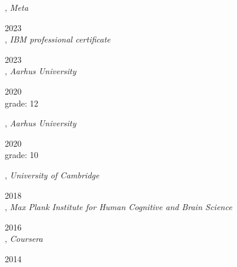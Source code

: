 

,
\textit{Meta}\strut \hfill 2023\\

,
\textit{IBM professional certificate}\strut \hfill 2023\\

,
\textit{Aarhus University}\strut \hfill 2020\\
grade: 12

,
\textit{Aarhus University}\strut \hfill 2020\\
grade: 10

,
\textit{University of Cambridge}\strut \hfill 2018\\

,
\textit{Max Plank Institute for Human Cognitive and Brain Science}\strut \hfill 2016\\

,
\textit{Coursera}\strut \hfill 2014\\

